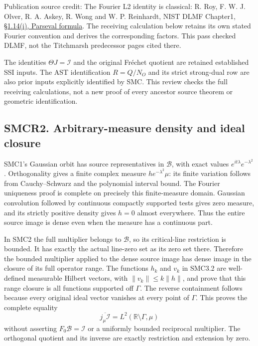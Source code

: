 Publication source credit: The Fourier L2 identity is classical: R. Roy,
F. W. J. Olver, R. A. Askey, R. Wong and W. P. Reinhardt, NIST DLMF
Chapter1, \href{https://dlmf.nist.gov/1.14\#i}{§1.14(i), Parseval
formula}. The receiving calculation below retains its own stated Fourier
convention and derives the corresponding factors. This pass checked
DLMF, not the Titchmarsh predecessor pages cited there.

The identities \(\Theta J=\mathcal I\) and the original Fréchet quotient
are retained established SSI inputs. The AST identification \(R=Q/N_O\)
and its strict strong-dual row are also prior inputs explicitly
identified by SMC. This review checks the full receiving calculations,
not a new proof of every ancestor source theorem or geometric
identification.

\subsection{SMCR2. Arbitrary-measure density and ideal
closure}\label{smcr2.-arbitrary-measure-density-and-ideal-closure}

SMC1's Gaussian orbit has source representatives in \(\mathcal B\), with
exact values \(e^{it\lambda}e^{-\lambda^2}\). Orthogonality gives a
finite complex measure \(h e^{-\lambda^2}\mu\): its finite variation
follows from Cauchy--Schwarz and the polynomial interval bound. The
Fourier uniqueness proof is complete on precisely this finite-measure
domain. Gaussian convolution followed by continuous compactly supported
tests gives zero measure, and its strictly positive density gives
\(h=0\) almost everywhere. Thus the entire source image is dense even
when the measure has a continuous part.

In SMC2 the full multiplier belongs to \(\mathcal B\), so its
critical-line restriction is bounded. It has exactly the actual
line-zero set as its zero set there. Therefore the bounded multiplier
applied to the dense source image has dense image in the closure of its
full operator range. The functions \(h_k\) and \(v_k\) in SMC3.2 are
well-defined measurable Hilbert vectors, with \(\|v_k\|\le k\|h\|\), and
prove that this range closure is all functions supported off \(\Gamma\).
The reverse containment follows because every original ideal vector
vanishes at every point of \(\Gamma\). This proves the complete equality
\[
\overline{j_\mu\mathcal I}=L^2(\mathbb R\setminus\Gamma,\mu)
\] without asserting \(F_0\mathcal B=\mathcal I\) or a uniformly bounded
reciprocal multiplier. The orthogonal quotient and its inverse are
exactly restriction and extension by zero.

